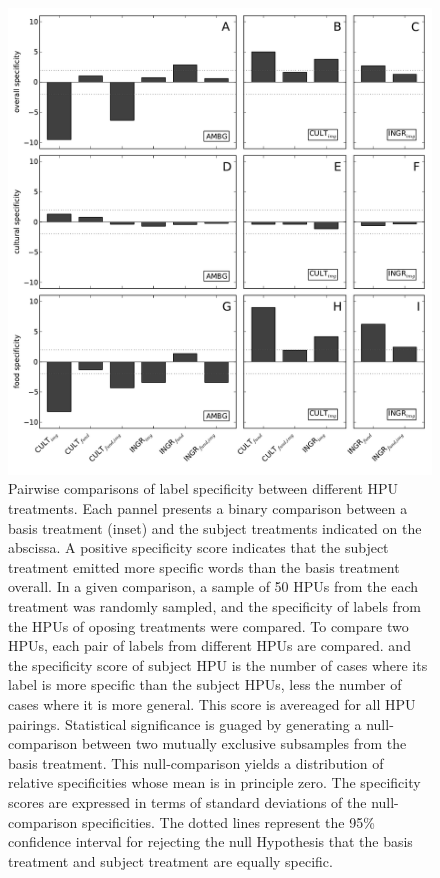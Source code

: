 \documentclass[letterpaper, 11pt, twocolumn]{article}
\begin{document}
\begin{figure}
	\begin{center}
	\includegraphics[scale=0.55]{../figs/specificity2.pdf}
	\caption{Pairwise comparisons of label specificity between different 
	HPU treatments.  Each pannel presents a binary comparison between a 
	basis treatment (inset) and the subject treatments indicated on the 
	abscissa.  A positive specificity score indicates that the subject 
	treatment emitted more specific words than the basis treatment overall.
	In a given comparison, a sample of 50 HPUs from the   
	each treatment was randomly sampled, and the specificity of labels from
	the HPUs of oposing treatments were compared.
	To compare two HPUs, each pair of labels from different HPUs are compared.
	and the specificity score of subject HPU is the number of cases where its
	label is more specific than the subject HPUs, less the number of cases 
	where it is more general. This score is 
	avereaged for all HPU pairings.  Statistical significance is guaged
	by generating a null-comparison between two mutually exclusive subsamples 
	from the basis treatment.  This null-comparison yields a distribution
	of relative specificities whose mean is in principle zero.  The 
	specificity scores are expressed in terms of standard deviations of
	the null-comparison specificities.  
	The dotted lines represent the 95\% confidence interval for rejecting 
	the null Hypothesis that the basis treatment and subject treatment are
	equally specific.
	}
	\label{fig:specificity}
	\end{center}
\end{figure}
\end{document}
